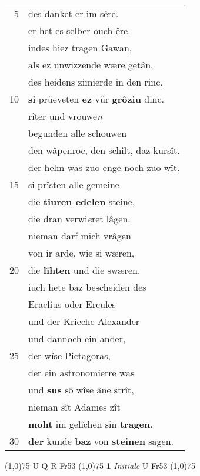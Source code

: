 \documentclass[8pt,a4paper,notitlepage]{article}
\begin{document}
\begin{table}[ht]
\begin{minipage}[t]{0.5\linewidth}
\begin{tabular}{rl}
5 & des danket er im sêre.\\ 
 & er het es selber ouch êre.\\ 
 & indes hiez tragen Gawan,\\ 
 & als ez unwizzende wære getân,\\ 
 & des heidens zimierde in den rinc.\\ 
10 & \textbf{si} prüeveten \textbf{ez} vür \textbf{grôziu} dinc.\\ 
 & rîter und vrouwe\textit{n}\\ 
 & begunden alle schouwen\\ 
 & den wâpenroc, den schilt, daz kursît.\\ 
 & der helm was zuo enge noch zuo wît.\\ 
15 & si prîsten alle gemeine\\ 
 & die \textbf{tiuren edelen} steine,\\ 
 & die dran verwi\textit{e}ret lâgen.\\ 
 & nieman darf mich vrâgen\\ 
 & von ir arde, wie si wæren,\\ 
20 & die \textbf{lîhten} und die swæren.\\ 
 & iuch hete baz bescheiden des\\ 
 & Eraclius oder Ercules\\ 
 & und der Krieche Alexander\\ 
 & und dannoch ein ander,\\ 
25 & der wîse Pictagoras,\\ 
 & der ein astronomierre was\\ 
 & und \textbf{sus} sô wîse âne strît,\\ 
 & nieman sît Adames zît\\ 
 & \textbf{moht} im gelîchen sin \textbf{tragen}.\\ 
30 & \textbf{der} kunde \textbf{baz} von \textbf{steinen} sagen.\\ 
\end{tabular}
\scriptsize
\line(1,0){75} \newline
U Q R Fr53 \newline
\line(1,0){75} \newline
\textbf{1} \textit{Initiale} U Fr53  \newline
\line(1,0){75} \newline

\end{minipage}
\end{table}
\end{document}

